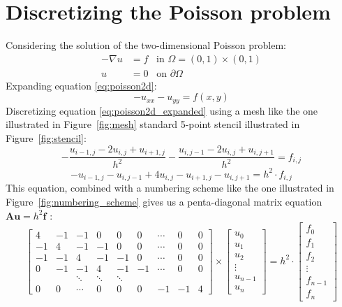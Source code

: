 
\section{Discretizing the Poisson problem} %
\label{sec:discretizing_the_poisson_problem}
Considering the solution of the two-dimensional Poisson problem:
\begin{align}
  - \nabla u &= f \;\;\; \text{in } \Omega = (0,1) \times (0,1) \label{eq:poisson2d} \\
  u &= 0 \;\;\; \text{on } \partial \Omega \label{eq:poisson2d_edge}
\end{align}
Expanding equation \eqref{eq:poisson2d}:
\begin{equation}
  -u_{xx} - u_{yy} = f(x,y) \label{eq:poisson2d_expanded}
\end{equation}
Discretizing equation \eqref{eq:poisson2d_expanded} using a mesh like the one illustrated in Figure~\ref{fig:mesh} standard 5-point stencil illustrated in Figure~\ref{fig:stencil}:
\begin{equation}
  \nonumber
  - \frac{u_{i-1,j} - 2u_{i,j} + u_{i+1,j}}{h^2} - \frac{u_{i,j-1} - 2u_{i,j} + u_{i,j+1}}{h^2} = f_{i,j}
\end{equation}
\begin{equation}
  -u_{i-1,j} -u_{i,j-1} + 4u_{i,j} - u_{i+1,j} - u_{i,j+1} = h^2 \cdot f_{i,j}
\end{equation}
This equation, combined with a numbering scheme like the one illustrated in Figure~\ref{fig:numbering_scheme} gives us a penta-diagonal matrix equation $\mathbf{Au}=h^2\mathbf{f}$ :
\begin{equation}
  \begin{bmatrix}
    4  & -1 & -1 & 0  & 0  & 0  & \cdots & 0 & 0 \\
    -1 & 4  & -1 & -1 & 0  & 0  & \cdots & 0 & 0 \\
    -1 & -1 & 4  & -1 & -1 & 0  & \cdots & 0 & 0 \\
    0  & -1 & -1 & 4  & -1 & -1 & \cdots & 0 & 0 \\
       & & \ddots & \ddots & \ddots &   &        &   &   \\
    0   & 0   & \cdots   &  0  & 0  &  0  &  -1  & -1 & 4
  \end{bmatrix}
  \times
  \begin{bmatrix}
    u_0 \\ u_1 \\ u_2 \\ \vdots \\ u_{n-1} \\ u_n
  \end{bmatrix}
  =
  h^2 \cdot
  \begin{bmatrix}
    f_0 \\ f_1 \\ f_2 \\ \vdots \\ f_{n-1} \\ f_n
  \end{bmatrix}
\end{equation}


